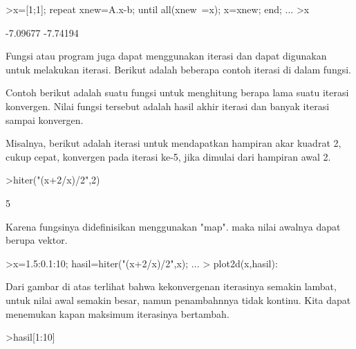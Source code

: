 \documentclass[a4paper,10pt]{article}
\begin{document}
\begin{eulernotebook}
\begin{eulercomment}
\begin{eulercomment}
\begin{eulercomment}
\begin{eulercomment}
\begin{eulercomment}
\begin{eulercomment}
\begin{eulercomment}
\begin{eulercomment}
\begin{eulercomment}
\begin{eulercomment}
\begin{eulercomment}
\begin{eulercomment}
\begin{eulercomment}
\begin{eulercomment}
\begin{eulercomment}
\begin{eulercomment}
\begin{eulerprompt}
>x=[1;1]; repeat xnew=A.x-b; until all(xnew~=x); x=xnew; end; ...
>x
\end{eulerprompt}
\begin{euleroutput}
       -7.09677 
       -7.74194 
\end{euleroutput}
\begin{eulercomment}
Fungsi atau program juga dapat menggunakan iterasi dan dapat digunakan
untuk melakukan iterasi. Berikut adalah beberapa contoh iterasi di
dalam fungsi.

Contoh berikut adalah suatu fungsi untuk menghitung berapa lama suatu
iterasi konvergen. Nilai fungsi tersebut adalah hasil akhir iterasi
dan banyak iterasi sampai konvergen.
\end{eulercomment}
\begin{eulercomment}
Misalnya, berikut adalah iterasi untuk mendapatkan hampiran akar
kuadrat 2, cukup cepat, konvergen pada iterasi ke-5, jika dimulai dari
hampiran awal 2.
\end{eulercomment}
\begin{eulerprompt}
>hiter("(x+2/x)/2",2)
\end{eulerprompt}
\begin{euleroutput}
  5
\end{euleroutput}
\begin{eulercomment}
Karena fungsinya didefinisikan menggunakan "map". maka nilai awalnya
dapat berupa vektor.
\end{eulercomment}
\begin{eulerprompt}
>x=1.5:0.1:10; hasil=hiter("(x+2/x)/2",x); ...
>  plot2d(x,hasil):
\end{eulerprompt}
\begin{eulercomment}
Dari gambar di atas terlihat bahwa kekonvergenan iterasinya semakin
lambat, untuk nilai awal semakin besar, namun penambahnnya tidak
kontinu. Kita dapat menemukan kapan maksimum iterasinya bertambah.
\end{eulercomment}
\begin{eulerprompt}
>hasil[1:10]
\end{eulerprompt}
\begin{euleroutput}

\end{euleroutput}
\end{eulercomment}
\end{eulercomment}
\end{eulercomment}
\end{eulercomment}
\end{eulercomment}
\end{eulercomment}
\end{eulercomment}
\end{eulercomment}
\end{eulercomment}
\end{eulercomment}
\end{eulercomment}
\end{eulercomment}
\end{eulercomment}
\end{eulercomment}
\end{eulercomment}
\end{eulercomment}
\end{eulernotebook}
\end{document}
